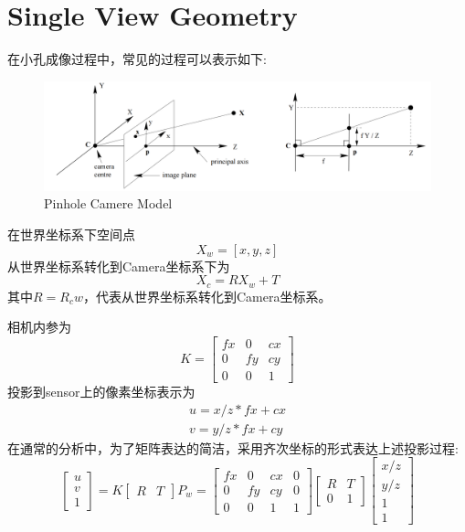 \section{Single View Geometry}
在小孔成像过程中，常见的过程可以表示如下:
\begin{figure}[H]
\centering
\includegraphics[scale=0.3]{Chapter1/PinholeCameraModel.png}
\caption{Pinhole Camere Model}
\end{figure}
在世界坐标系下空间点\[X_w=[x,y,z]\]
从世界坐标系转化到Camera坐标系下为 \[X_c = RX_w+T\]
其中$R = R_cw$，代表从世界坐标系转化到Camera坐标系。\par
相机内参为
\[ K = \left[ \begin{array}{ccc} fx & 0 & cx \\ 0 & fy & cy  \\ 0 & 0 & 1 \end{array}\right] \]
投影到sensor上的像素坐标表示为\[\begin{array}{cc}u=x/z*fx+cx \\  v = y/z*fx+cy\end{array}\]
在通常的分析中，为了矩阵表达的简洁，采用齐次坐标的形式表达上述投影过程:
\[ \left[\begin{array}{ccc} u\\v\\1\end{array}\right]
=
K \left[ \begin{array}{c|c} R & T \end{array}\right] P_w
=
\left[ \begin{array}{cccc} fx & 0 & cx & 0 \\ 0 & fy & cy & 0 \\ 0 &  0 &  1 & 1\end{array}\right]
\left[ \begin{array}{cc} R & T\\0 &1 \end{array}\right]
\left[ \begin{array}{c} x/z \\y/z\\1\\1\end{array} \right]
\]
